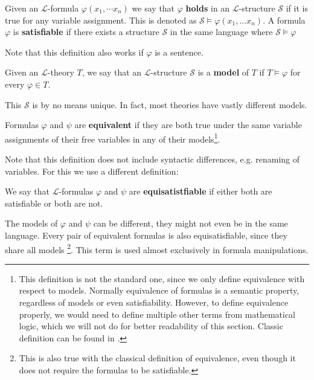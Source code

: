 \begin{defn}
Given an $\mathcal{L}$-formula $\varphi(x_1,\cdots x_n)$ we say that $\varphi$ \textbf{holds} in an $\mathcal{L}$-structure $\mathcal{S}$ if it is true for any variable assignment. This is denoted as $\mathcal{S}\models \varphi(x_1,\dots x_n)$. A formula $\varphi$ is \textbf{satisfiable} if there exists a structure $\mathcal{S}$ in the same language where $\mathcal{S}\models \varphi$
\end{defn}
Note that this definition also works if $\varphi$ is a sentence.

\begin{defn}
Given an $\mathcal{L}$-theory $T$, we say that an $\mathcal{L}$-structure $\mathcal{S}$ is a \textbf{model} of $T$ if $T\models \varphi$ for every $\varphi\in T$.
\end{defn}
This $\mathcal{S}$ is by no means unique. In fact, most theories have vastly different models.

\begin{defn}
Formulas $\varphi$ and $\psi$ are \textbf{equivalent} if they are both true under the same variable assignments of their free variables in any of their models\footnote{This definition is not the standard one, since we only define equivalence with respect to models. Normally equivalence of formulas is a semantic property, regardless of models or even satisfiability. However, to define equivalence properly, we would need to define multiple other terms from mathematical logic, which we will not do for better readability of this section. Classic definition can be found in \cite{logic}.}.
\end{defn}

Note that this definition does not include syntactic differences, e.g. renaming of variables. For this we use a different definition:

\begin{defn}
	We say that $\mathcal{L}$-formulas $\varphi$ and $\psi$ are \textbf{equisatistfiable} if either both are satisfiable or both are not.
\end{defn}

The models of $\varphi$ and $\psi$ can be different, they might not even be in the same language. Every pair of equivalent formulas is also equisatisfiable, since they share all models \footnote{This is also true with the classical definition of equivalence, even though it does not require the formulas to be satisfiable.}. This term is used almost exclusively in formula manipulations.

